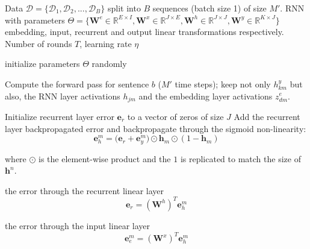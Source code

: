 \begin{algorithm}
\caption{Backpropagation for a Recurrent Neural Network (RNN) with embeddings}
\begin{algorithmic}[1]
\label{algo:rnnbackprop}

        Data $\mathcal{D}=\{\mathcal{D}_1,\mathcal{D}_2,...,\mathcal{D}_B\}$ split into $B$ sequences (batch size 1) of size $M'$. RNN with parameters $\Theta=\{\mathbf{W}^e \in \mathbb{R}^{E \times I}, \mathbf{W}^x \in \mathbb{R}^{J \times E}, \mathbf{W}^h \in \mathbb{R}^{J \times J}, \mathbf{W}^y \in \mathbb{R}^{K \times J} \}$ embedding, input, recurrent and output linear transformations respectively. Number of rounds $T$, learning rate $\eta$

   \STATE initialize parameters $\Theta$ randomly


	\vspace{0.3cm}
        \STATE Compute the {forward pass} for sentence $b$ ($M'$ time steps);
        keep not only $h_{km}^y$ but also, the RNN layer activations $h_{jm}$ and the embedding layer activations $z^e_{dm}$.
	\ENDFOR	
	\vspace{0.3cm}

	\ENDFOR	

    \STATE Initialize recurrent layer error $\mathbf{e}_r$ to a vector of zeros of size $J$
	\STATE Add the recurrent layer backpropagated error and backpropagate through the sigmoid non-linearity:
        $$\mathbf{e}^m_{h} = \Big(\mathbf{e}_{r} + \mathbf{e}^m_y\Big) \odot \mathbf{h}_m \odot (\mathbf{\mathrm{1}}-\mathbf{h}_m)$$

	\STATE where $\odot$ is the element-wise product and the $\mathbf{\mathrm{1}}$ is replicated to match the size of $\mathbf{h}^n$.

	 the error through the recurrent linear layer
    $$\mathbf{e}_r = (\mathbf{W}^h)^T \mathbf{e}_h^m$$

	 the error through the input linear layer
    $$\mathbf{e}_e^m = (\mathbf{W}^x)^T \mathbf{e}_h^m$$


\end{algorithmic}
\end{algorithm}
